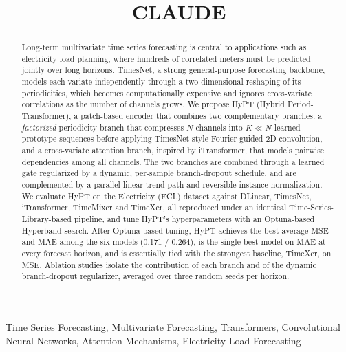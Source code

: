 \documentclass[10pt,journal]{IEEEtran}
\begin{document}
\title{CLAUDE}

\author{
}

\maketitle

\begin{abstract}
Long-term multivariate time series forecasting is central to applications such as electricity load planning, where hundreds of correlated meters must be predicted jointly over long horizons. TimesNet, a strong general-purpose forecasting backbone, models each variate independently through a two-dimensional reshaping of its periodicities, which becomes computationally expensive and ignores cross-variate correlations as the number of channels grows. We propose HyPT (Hybrid Period-Transformer), a patch-based encoder that combines two complementary branches: a \emph{factorized} periodicity branch that compresses $N$ channels into $K \!\ll\! N$ learned prototype sequences before applying TimesNet-style Fourier-guided 2D convolution, and a cross-variate attention branch, inspired by iTransformer, that models pairwise dependencies among all channels. The two branches are combined through a learned gate regularized by a dynamic, per-sample branch-dropout schedule, and are complemented by a parallel linear trend path and reversible instance normalization. We evaluate HyPT on the Electricity (ECL) dataset against DLinear, TimesNet, iTransformer, TimeMixer and TimeXer, all reproduced under an identical Time-Series-Library-based pipeline, and tune HyPT's hyperparameters with an Optuna-based Hyperband search. After Optuna-based tuning, HyPT achieves the best average MSE and MAE among the six models (0.171 / 0.264), is the single best model on MAE at every forecast horizon, and is essentially tied with the strongest baseline, TimeXer, on MSE. Ablation studies isolate the contribution of each branch and of the dynamic branch-dropout regularizer, averaged over three random seeds per horizon.
\end{abstract}

\begin{IEEEkeywords}
Time Series Forecasting, Multivariate Forecasting, Transformers, Convolutional Neural Networks, Attention Mechanisms, Electricity Load Forecasting
\end{IEEEkeywords}
\end{document}
